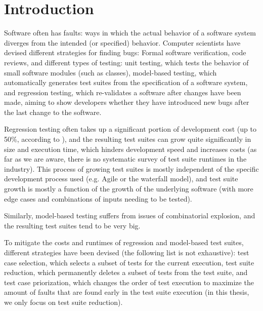 
\chapter{Introduction}\label{chapter:introduction}

Software often has faults: ways in which the actual behavior of a software
system diverges from the intended (or specified) behavior. Computer
scientists have devised different strategies for finding bugs: Formal
software verification, code reviews, and different types of testing:
unit testing, which tests the behavior of small software modules (such
as classes), model-based testing, which automatically generates test
suites from the specification of a software system, and regression
testing, which re-validates a software after changes have been made,
aiming to show developers whether they have introduced new bugs after
the last change to the software.


Regression testing often takes up a significant portion of development
cost (up to 50\%, according to \cite{ramler2006economic}), and the
resulting test suites can grow quite significantly in size and execution
time, which hinders development speed and increases costs (as far as we
are aware, there is no systematic survey of test suite runtimes in the
industry). This process of growing test suites is mostly independent
of the specific development process used (e.g. Agile or the waterfall
model), and test suite growth is mostly a function of the growth of the
underlying software (with more edge cases and combinations of inputs
needing to be tested).

Similarly, model-based testing suffers from issues of combinatorial explosion,
and the resulting test suites tend to be very big.

To mitigate the costs and runtimes of regression and model-based test
suites, different strategies have been devised (the following list is
not exhaustive): test case selection, which selects a subset of tests for
the current execution, test suite reduction, which permanently deletes a
subset of tests from the test suite, and test case priorization, which
changes the order of test execution to maximize the amount of faults
that are found early in the test suite execution (in this thesis, we
only focus on test suite reduction).

